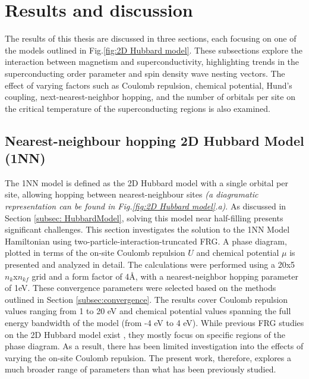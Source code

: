 \documentclass[12pt]{article}
\begin{document}
\section{Results and discussion}

The results of this thesis are discussed in three sections, each focusing on one of the models outlined in Fig.\ref{fig:2D Hubbard model}.
These subsections explore the interaction between magnetism and superconductivity, highlighting trends in the superconducting order parameter 
and spin density wave nesting vectors. The effect of varying factors such as Coulomb repulsion, 
chemical potential, Hund's coupling, next-nearest-neighbor hopping, and the number of orbitals per site 
on the critical temperature of the superconducting regions is also examined.

\subsection{Nearest-neighbour hopping 2D Hubbard Model (1NN)}
\label{subsec:1NNModel}

The 1NN model is defined as the 2D Hubbard model with a single orbital per site,  allowing hopping between nearest-neighbour sites \textit{(a diagramatic representation can be found in Fig.\ref{fig:2D Hubbard model}.a)}. 
As discussed in Section \ref{subsec: HubbardModel}, solving this model near half-filling presents significant challenges. This section investigates the solution to the 1NN Model Hamiltonian using two-particle-interaction-truncated FRG. A phase diagram, plotted in terms of the on-site Coulomb repulsion 
$U$ and chemical potential $\mu$ is presented and analyzed in detail. The calculations were performed using a 20x5 $n_k$x$n_{kf}$
grid and a form factor of 4\AA, with a nearest-neighbor hopping parameter of 1eV.
These convergence parameters were selected based on the methods outlined in Section \ref{subsec:convergence}. 
The results cover Coulomb repulsion values ranging from 1 to 20 eV and chemical potential values spanning the full energy bandwidth 
of the model (from -4 eV to 4 eV). While previous FRG studies on the 2D Hubbard model exist \cite{beyer2023rashba,hille2020quantitative,vilardi2020dynamical},
they mostly focus on specific regions of the phase diagram. As a result, there has been limited investigation into the effects of varying the on-site Coulomb repulsion.
The present work, therefore, explores a much broader range of parameters than what has been previously studied.\par
\medskip
\end{document}
